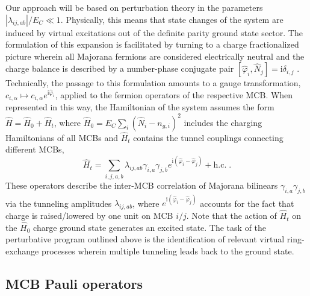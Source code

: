 \documentclass[twocolumn,floats,prx,showpacs]{revtex4-1}
\begin{document}
Our approach will be based on perturbation theory in the parameters $|\lambda_{ij,ab}|/E_C \ll 1$. Physically, this means that state changes of the system are induced by virtual excitations out of the definite parity ground state sector. The formulation of this expansion is facilitated by turning to a charge fractionalized picture wherein all Majorana fermions are considered electrically neutral and the charge balance is described by a number-phase conjugate pair $[\hat\varphi_i,\hat N_j] ={\mathrm i}
\delta_{i,j}$ \cite{Fu2010,Altland2013,Beri2013}. Technically, the passage to this formulation amounts to a gauge transformation, $c_{i,\alpha} \mapsto c_{i,\alpha} e^{\mathrm i\hat\varphi_i}$, applied to the fermion operators of the respective MCB. When represented in this way, the Hamiltonian of the system assumes the form    
$\hat H=\hat  H_0 +  \hat H_t$,
where $\hat H_0=E_C \sum_i (\hat N_i-n_{g,i})^2$ includes the charging Hamiltonians of all MCBs and $\hat H_t$ contains the tunnel couplings connecting different MCBs,
\begin{equation}\label{eq:V}
 \hat H_t=\sum_{i,j,a,b} \lambda_{ij,ab} \gamma_{i,a} \gamma_{j,b} e^{\mathrm i(\hat \varphi_i - \hat \varphi_j)} +\mathrm{h.c.}\;.
\end{equation}
These operators describe the inter-MCB correlation of Majorana bilinears $\gamma_{i,a} \gamma_{j,b}$ via the tunneling amplitudes $\lambda_{ij,ab}$, where  $e^{\mathrm i(\hat \varphi_i - \hat \varphi_j)}$ accounts for the fact that charge is raised/lowered by one unit on MCB $i/j$. Note that the action of $\hat H_t$ on the 
$\hat H_0$ charge ground state generates an excited state. The task of the perturbative program outlined above is the identification of relevant virtual ring-exchange processes wherein multiple tunneling leads back to the ground state.
 
\subsection{MCB Pauli operators}\label{sec2c}
\end{document}
